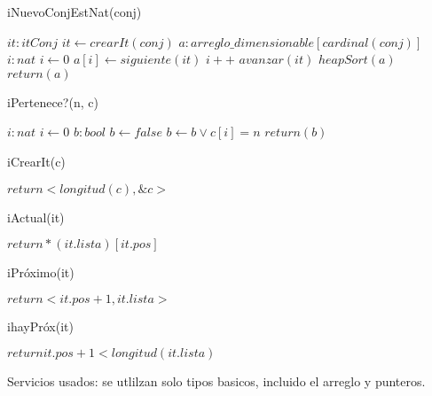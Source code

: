 \begin{algorithm}
\caption{iNuevoConjEstNat(conj)}
\begin{algorithmic}
	\State $it:itConj$
	\State $it \gets crearIt(conj)$
	\State $a : arreglo\_dimensionable[cardinal(conj)]$
	\State $i : nat$
	\State $i \gets 0$
	\State $a[i] \gets siguiente(it)$
	\State $i++$
	\State $avanzar(it)$
	\EndWhile
	\State $heapSort(a)$
	\State $return(a)$
\end{algorithmic}
\end{algorithm}
	
\begin{algorithm}
\caption{iPertenece?(n, c)}
\begin{algorithmic}
	\State $i : nat$
	\State $i \gets 0$
	\State $b : bool$
	\State $b \gets false$
	\State $b \gets b \lor c[i]=n$
	\EndWhile
	\State $return(b)$
\end{algorithmic}
\end{algorithm}
	
\begin{algorithm}
\caption{iCrearIt(c)}
\begin{algorithmic}
	\State $return <longitud(c), \&c>$ 
\end{algorithmic}
\end{algorithm}

\begin{algorithm}
\caption{iActual(it)}
\begin{algorithmic}
	\State $return *(it.lista)[it.pos]$	
\end{algorithmic}
\end{algorithm}

\begin{algorithm}
\caption{iPr\'oximo(it)}
\begin{algorithmic}
	\State $return <it.pos+1, it.lista>$	
\end{algorithmic}
\end{algorithm}


\begin{algorithm}
\caption{ihayPr\'ox(it)}
\begin{algorithmic}
	\State $return it.pos+1<longitud(it.lista)$	
\end{algorithmic}
\end{algorithm}

Servicios usados: se utlilzan solo tipos basicos, incluido el arreglo y punteros.
